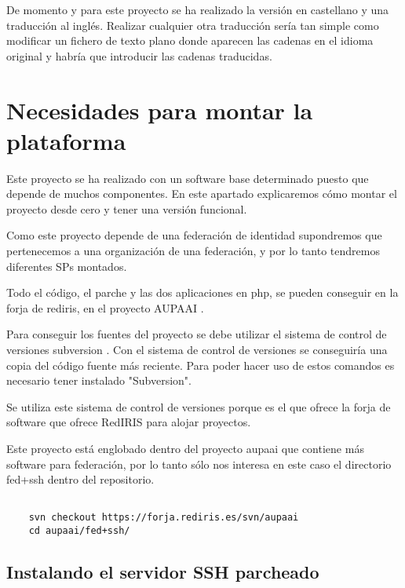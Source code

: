     De momento y para este proyecto se ha realizado la versión en
    castellano y una traducción al inglés. Realizar cualquier otra
    traducción sería tan simple como modificar un fichero de texto
    plano donde aparecen las cadenas en el idioma original y habría
    que introducir las cadenas traducidas.

\section{Necesidades para montar la plataforma}

    Este proyecto se ha realizado con un software base determinado
    puesto que depende de muchos componentes. En este apartado
    explicaremos cómo montar el proyecto desde cero y tener una
    versión funcional.

    Como este proyecto depende de una federación de identidad
    supondremos que pertenecemos a una organización de una federación,
    y por lo tanto tendremos diferentes SPs montados.

    Todo el código, el parche y las dos aplicaciones en php, se
    pueden conseguir en la forja de rediris, en el proyecto AUPAAI 
    \cite{forja}.

    Para conseguir los fuentes del proyecto se debe utilizar el
    sistema de control de versiones subversion \cite{svn}. Con el
    sistema de control de versiones se conseguiría una copia del
    código fuente más reciente. Para poder hacer uso de estos comandos
    es necesario tener instalado "Subversion".

    Se utiliza este sistema de control de versiones porque es el que
    ofrece la forja de software que ofrece RedIRIS para alojar
    proyectos.

    Este proyecto está englobado dentro del proyecto aupaai que
    contiene más software para federación, por lo tanto sólo nos
    interesa en este caso el directorio fed+ssh dentro del
    repositorio.

    \begin{verbatim}

    svn checkout https://forja.rediris.es/svn/aupaai   
    cd aupaai/fed+ssh/

    \end{verbatim}


\subsection{Instalando el servidor SSH parcheado}

